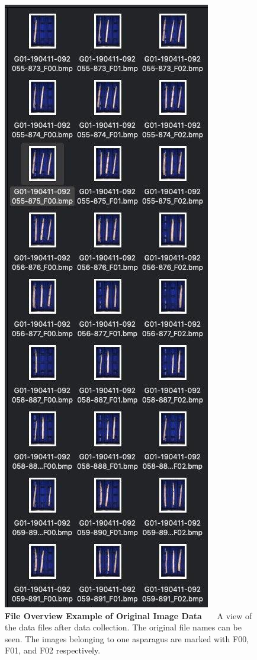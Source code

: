 \begin{figure}[h]
	\centering
	\includegraphics[scale=0.4]{Figures/appendix/original_files_naming_conventions.png}
	\decoRule
	\caption[File Overview Example of Original Image Data]{\textbf{File Overview Example of Original Image Data}~~~ A view of the data files after data collection. The original file names can be seen. The images belonging to one asparagus are marked with F00, F01, and F02 respectively.}
	\label{fig:Original_Data_Overview}
\end{figure}

